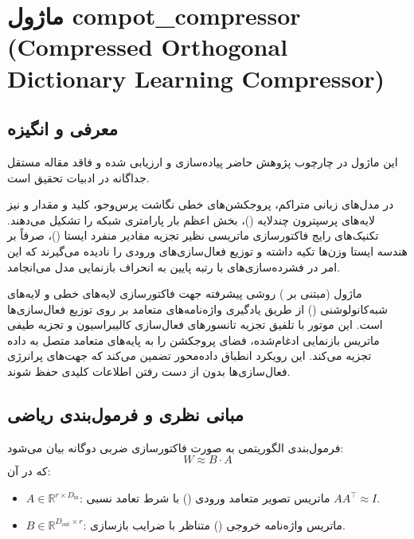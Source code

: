 \section{ماژول compot\_compressor (Compressed Orthogonal Dictionary Learning Compressor)}
\label{sec:module_compot_compressor}

\subsection{معرفی و انگیزه}
این ماژول در چارچوب پژوهش حاضر پیاده‌سازی و ارزیابی شده و فاقد مقاله مستقل جداگانه در ادبیات تحقیق است.

در مدل‌های زبانی متراکم، پروجکشن‌های خطی نگاشت پرس‌وجو، کلید و مقدار و نیز لایه‌های پرسپترون چندلایه ()، بخش اعظم بار پارامتری شبکه را تشکیل می‌دهند. تکنیک‌های رایج فاکتورسازی ماتریسی نظیر تجزیه مقادیر منفرد ایستا ()، صرفاً بر هندسه ایستا وزن‌ها تکیه داشته و توزیع فعال‌سازی‌های ورودی را نادیده می‌گیرند که این امر در فشرده‌سازی‌های با رتبه پایین به انحراف بازنمایی مدل می‌انجامد.

ماژول  (مبتنی بر ) روشی پیشرفته جهت فاکتورسازی لایه‌های خطی و لایه‌های شبه‌کانولوشنی () از طریق یادگیری واژه‌نامه‌های متعامد بر روی توزیع فعال‌سازی‌ها است. این موتور با تلفیق تجزیه  تانسورهای فعال‌سازی کالیبراسیون و تجزیه طیفی ماتریس بازنمایی ادغام‌شده، فضای پروجکشن را به پایه‌های متعامد متصل به داده تجزیه می‌کند. این رویکرد انطباق داده‌محور تضمین می‌کند که جهت‌های پرانرژی فعال‌سازی‌ها بدون از دست رفتن اطلاعات کلیدی حفظ شوند.

\subsection{مبانی نظری و فرمول‌بندی ریاضی}
فرمول‌بندی الگوریتمی  به صورت فاکتورسازی ضربی دوگانه بیان می‌شود:
\begin{equation}
W \approx B \cdot A
\end{equation}
که در آن:
\begin{itemize}
    \item $A \in \mathbb{R}^{r \times D_{\text{in}}}$: ماتریس تصویر متعامد ورودی () با شرط تعامد نسبی $A A^\top \approx I$.
    \item $B \in \mathbb{R}^{D_{\text{out}} \times r}$: ماتریس واژه‌نامه خروجی () متناظر با ضرایب بازسازی.
\end{itemize}

